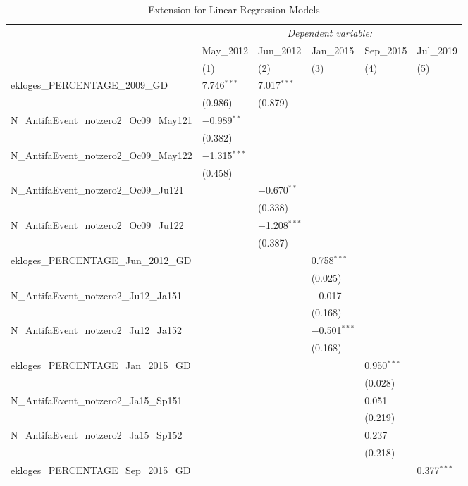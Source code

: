 \documentclass[12pt,letterpaper]{article}
\begin{document}
\begin{table}[!htbp] 
	\centering 
	\caption{Extension for Linear Regression Models } 
	\label{} 
	\small
	\renewcommand{\tabularxcolumn}[1]{m{#1}} 
	\begin{tabularx}{\textwidth}{@{\extracolsep{5pt}}l *{5}{X}@{}} 
		\hline 
		\hline 
		& \multicolumn{5}{c}{\textit{Dependent variable:}} \\ 
		\cline{2-6} 
		& May\_2012& Jun\_2012 & Jan\_2015 & Sep\_2015 & Jul\_2019\\ 
		& (1) & (2) & (3) & (4) & (5)\\ 
		\hline 
		ekloges\_PERCENTAGE\_2009\_GD & 7.746$^{***}$ & 7.017$^{***}$ &  &  &  \\ 
		& (0.986) & (0.879) &  &  &  \\ 
		N\_AntifaEvent\_notzero2\_Oc09\_May121 & $-$0.989$^{**}$ &  &  &  &  \\ 
		& (0.382) &  &  &  &  \\ 
		N\_AntifaEvent\_notzero2\_Oc09\_May122 & $-$1.315$^{***}$ &  &  &  &  \\ 
		& (0.458) &  &  &  &  \\ 
		N\_AntifaEvent\_notzero2\_Oc09\_Ju121 &  & $-$0.670$^{**}$ &  &  &  \\ 
		&  & (0.338) &  &  &  \\ 
		N\_AntifaEvent\_notzero2\_Oc09\_Ju122 &  & $-$1.208$^{***}$ &  &  &  \\ 
		&  & (0.387) &  &  &  \\ 
		ekloges\_PERCENTAGE\_Jun\_2012\_GD &  &  & 0.758$^{***}$ &  &  \\ 
		&  &  & (0.025) &  &  \\ 
		N\_AntifaEvent\_notzero2\_Ju12\_Ja151 &  &  & $-$0.017 &  &  \\ 
		&  &  & (0.168) &  &  \\ 
		N\_AntifaEvent\_notzero2\_Ju12\_Ja152 &  &  & $-$0.501$^{***}$ &  &  \\ 
		&  &  & (0.168) &  &  \\ 
		ekloges\_PERCENTAGE\_Jan\_2015\_GD &  &  &  & 0.950$^{***}$ &  \\ 
		&  &  &  & (0.028) &  \\ 
		N\_AntifaEvent\_notzero2\_Ja15\_Sp151 &  &  &  & 0.051 &  \\ 
		&  &  &  & (0.219) &  \\ 
		N\_AntifaEvent\_notzero2\_Ja15\_Sp152 &  &  &  & 0.237 &  \\ 
		&  &  &  & (0.218) &  \\ 
		ekloges\_PERCENTAGE\_Sep\_2015\_GD &  &  &  &  & 0.377$^{***}$ \\ 

\end{tabularx}
\end{table}
\end{document}
